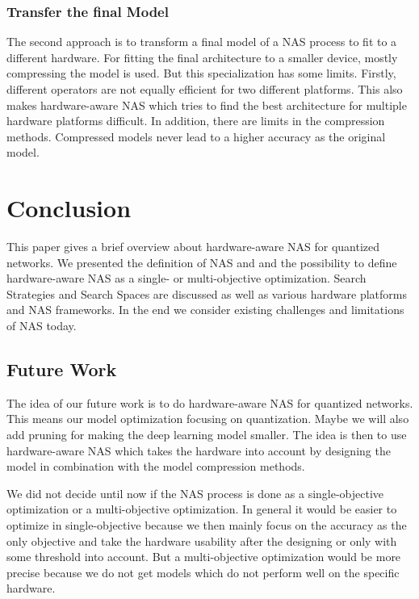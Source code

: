 \documentclass[conference]{IEEEtran}
\begin{document}
\subsubsection{Transfer the final Model}

The second approach is to transform a final model of a NAS process to fit to a different hardware. For fitting the final architecture to a smaller device, mostly compressing the model is used. But this specialization has some limits. Firstly, different operators are not equally efficient for two different platforms. This also makes hardware-aware NAS which tries to find the best architecture for multiple hardware platforms difficult. In addition, there are limits in the compression methods. Compressed models never lead to a higher accuracy as the original model. 

\section{Conclusion}

This paper gives a brief overview about hardware-aware NAS for quantized networks. We presented the definition of NAS and and the possibility to define hardware-aware NAS as a single- or multi-objective optimization. Search Strategies and Search Spaces are discussed as well as various hardware platforms and NAS frameworks. In the end we consider existing challenges and limitations of NAS today.

\subsection{Future Work}

The idea of our future work is to do hardware-aware NAS for quantized networks. This means our model optimization focusing on quantization. Maybe we will also add pruning for making the deep learning model smaller. The idea is then to use hardware-aware NAS which takes the hardware into account by designing the model in combination with the model compression methods. 

We did not decide until now if the NAS process is done as a single-objective optimization or a multi-objective optimization. In general it would be easier to optimize in single-objective because we then mainly focus on the accuracy as the only objective and take the hardware usability after the designing or only with some threshold into account. But a multi-objective optimization would be more precise because we do not get models which do not perform well on the specific hardware. 
\end{document}
